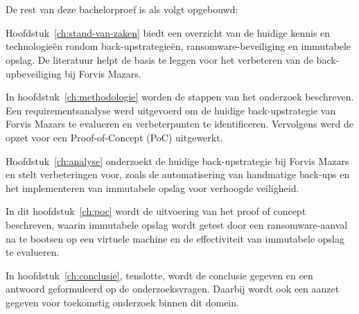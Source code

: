 \section{}%
\label{sec:opzet-bachelorproef}


De rest van deze bachelorproef is als volgt opgebouwd:

Hoofdstuk~\ref{ch:stand-van-zaken} biedt een overzicht van de huidige kennis en technologieën rondom back-upstrategieën, ransomware-beveiliging en immutabele opslag. De literatuur helpt de basis te leggen voor het verbeteren van de back-upbeveiliging bij Forvis Mazars.

In hoofdstuk~\ref{ch:methodologie} worden de stappen van het onderzoek beschreven. Een requirementsanalyse werd uitgevoerd om de huidige back-upstrategie van Forvis Mazars te evalueren en verbeterpunten te identificeren. Vervolgens werd de opzet voor een Proof-of-Concept (PoC) uitgewerkt.

Hoofdstuk~\ref{ch:analyse} onderzoekt de huidige back-upstrategie bij Forvis Mazars en stelt verbeteringen voor, zoals de automatisering van handmatige back-ups en het implementeren van immutabele opslag voor verhoogde veiligheid.

In dit hoofdstuk~\ref{ch:poc} wordt de uitvoering van het proof of concept beschreven, waarin immutabele opslag wordt getest door een ransomware-aanval na te bootsen op een virtuele machine en de effectiviteit van immutabele opslag te evalueren.

In hoofdstuk~\ref{ch:conclusie}, tenslotte, wordt de conclusie gegeven en een antwoord geformuleerd op de onderzoeksvragen. Daarbij wordt ook een aanzet gegeven voor toekomstig onderzoek binnen dit domein.